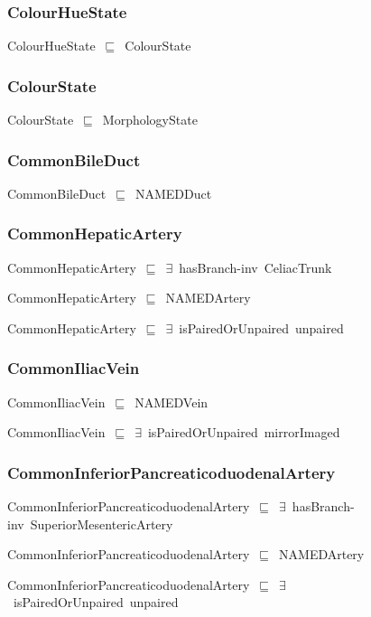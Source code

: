 \documentclass{article}
\begin{document}
\subsubsection*{ColourHueState}

ColourHueState~\ensuremath{\sqsubseteq}~ColourState~

\subsubsection*{ColourState}

ColourState~\ensuremath{\sqsubseteq}~MorphologyState~

\subsubsection*{CommonBileDuct}

CommonBileDuct~\ensuremath{\sqsubseteq}~NAMEDDuct~

\subsubsection*{CommonHepaticArtery}

CommonHepaticArtery~\ensuremath{\sqsubseteq}~\ensuremath{\exists}~hasBranch-inv~CeliacTrunk~

CommonHepaticArtery~\ensuremath{\sqsubseteq}~NAMEDArtery~

CommonHepaticArtery~\ensuremath{\sqsubseteq}~\ensuremath{\exists}~isPairedOrUnpaired~unpaired~

\subsubsection*{CommonIliacVein}

CommonIliacVein~\ensuremath{\sqsubseteq}~NAMEDVein~

CommonIliacVein~\ensuremath{\sqsubseteq}~\ensuremath{\exists}~isPairedOrUnpaired~mirrorImaged~

\subsubsection*{CommonInferiorPancreaticoduodenalArtery}

CommonInferiorPancreaticoduodenalArtery~\ensuremath{\sqsubseteq}~\ensuremath{\exists}~hasBranch-inv~SuperiorMesentericArtery~

CommonInferiorPancreaticoduodenalArtery~\ensuremath{\sqsubseteq}~NAMEDArtery~

CommonInferiorPancreaticoduodenalArtery~\ensuremath{\sqsubseteq}~\ensuremath{\exists}~isPairedOrUnpaired~unpaired~
\end{document}
